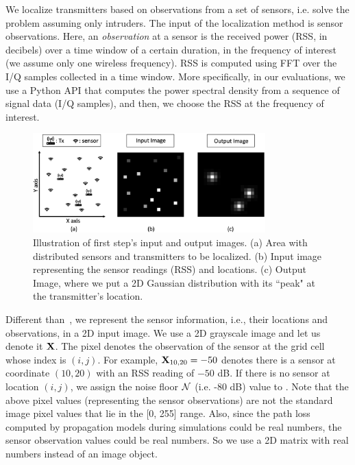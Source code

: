 We localize transmitters based on observations from a set of sensors, i.e. solve the \mtl problem assuming only intruders.
The input of the localization method is sensor observations. 
Here, an {\em observation} at a sensor is the received power (RSS, in decibels) over a time window of a certain duration, in the frequency of interest (we assume only one wireless frequency). 
RSS is computed using FFT over the I/Q samples collected in a time window. More specifically, in our evaluations, we use a Python API \cite{psd} that computes the power spectral density from a sequence of signal data (I/Q samples), and then, we choose the RSS at the frequency of interest.
\begin{figure}[t]
    \centering
    \includegraphics[width=0.8\textwidth]{chapters/wowmom-pmc/figures/input-output.png}
    \caption{Illustration of \our first step's input and output images. (a) Area with distributed sensors and transmitters to be localized. (b) Input image representing the sensor readings (RSS) and locations. (c) Output Image, where we put a 2D Gaussian distribution with its ``peak" at the transmitter's location.}
    \label{fig:input}
\end{figure}
Different than~\cite{mobicom17-splot,ipsn20-mtl}, we represent the sensor information, i.e.,
their locations and observations, in a 2D input image.
We use a 2D grayscale image and let us denote it $\mathbf{X}$. The pixel \mxij denotes the observation of the sensor at the grid cell whose index is $(i, j)$. For example, $\mathbf{X}_{10, 20}=-50$ denotes there is a sensor at coordinate $(10, 20)$ with an RSS reading of $-50$ dB. 
If there is no sensor at location $(i, j)$, we assign the noise floor $\cal{N}$ (i.e. -80 dB) value to \mxij.
Note that the above pixel values (representing the sensor observations) are not the standard
image pixel values that lie in the [0, 255] range.
Also, since the path loss computed by propagation models during simulations could be real numbers, the sensor observation values could be real numbers. 
So we use a 2D matrix with real numbers instead of an image object.

